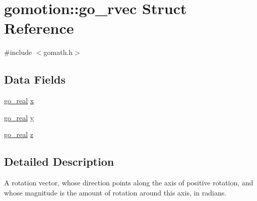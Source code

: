 \hypertarget{structgomotion_1_1go__rvec}{\section{gomotion\-:\-:go\-\_\-rvec Struct Reference}
\label{structgomotion_1_1go__rvec}
}


{\ttfamily \#include $<$gomath.\-h$>$}

\subsection*{Data Fields}
\begin{DoxyCompactItemize}
\item 
\hyperlink{gotypes_8h_afd666a2393eebd71ee455846ac9def9b}{go\-\_\-real} \hyperlink{structgomotion_1_1go__rvec_ae29a06bf1a12fc0d321442026f513117}{x}
\item 
\hyperlink{gotypes_8h_afd666a2393eebd71ee455846ac9def9b}{go\-\_\-real} \hyperlink{structgomotion_1_1go__rvec_a5f560402a28bd1cf2ced1cdd627e8e30}{y}
\item 
\hyperlink{gotypes_8h_afd666a2393eebd71ee455846ac9def9b}{go\-\_\-real} \hyperlink{structgomotion_1_1go__rvec_a47712173e216ec298c4d58af0abfb100}{z}
\end{DoxyCompactItemize}


\subsection{Detailed Description}
A rotation vector, whose direction points along the axis of positive rotation, and whose magnitude is the amount of rotation around this axis, in radians. 

